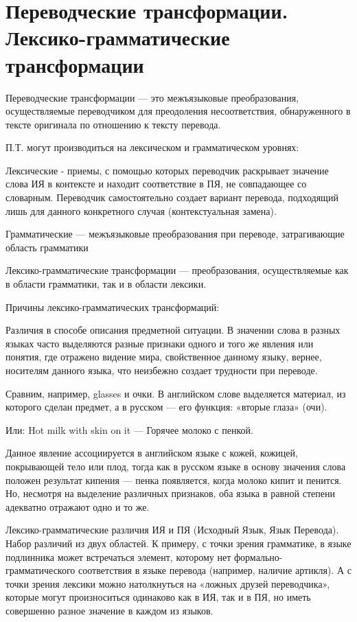 \section{Переводческие трансформации. Лексико-грамматические трансформации}

Переводческие трансформации --- это межъязыковые преобразования, осуществляемые переводчиком для преодоления несоответствия, обнаруженного в тексте оригинала по отношению к тексту перевода.

П.Т. могут производиться на лексическом и грамматическом уровнях:

Лексические - приемы, с помощью которых переводчик раскрывает значение слова ИЯ в контексте и находит соответствие в ПЯ, не совпадающее со словарным. Переводчик самостоятельно создает вариант перевода, подходящий лишь для данного конкретного случая (контекстуальная замена).

Грамматические --- межъязыковые преобразования при переводе, затрагивающие область грамматики

Лексико-грамматические трансформации --- преобразования, осуществляемые как в области грамматики, так и в области лексики. 

Причины лексико-грамматических трансформаций:

Различия в способе описания предметной ситуации. В значении слова в разных языках часто выделяются разные признаки одного и того же явления или понятия, где отражено видение мира, свойственное данному языку, вернее, носителям данного языка, что неизбежно создает трудности при переводе.

Сравним, например, glasses и очки. В английском слове выделяется материал, из которого сделан предмет, а в русском --- его функция: «вторые глаза» (очи).

Или: Hot milk with skin on it  --- Горячее молоко с пенкой.

Данное явление ассоциируется в английском языке с кожей, кожицей, покрывающей тело или плод, тогда как в русском языке в основу значения слова положен результат кипения --- пенка появляется, когда молоко кипит и пенится. Но, несмотря на выделение различных признаков, оба языка в равной степени адекватно отражают одно и то же. 

Лексико-грамматические различия ИЯ и ПЯ (Исходный Язык, Язык Перевода). Набор различий из двух областей. К примеру, с точки зрения грамматике, в языке подлинника может встречаться элемент, которому нет формально-грамматического соответствия в языке перевода (например, наличие артикля). А с точки зрения лексики можно натолкнуться на «ложных друзей переводчика», которые могут произноситься одинаково как в ИЯ, так и в ПЯ, но иметь совершенно разное значение в каждом из языков. 

